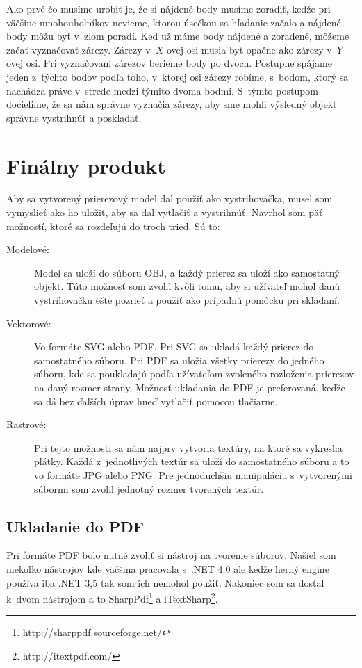 Ako prvé čo musíme urobiť je, že si nájdené body musíme zoradiť, kedže pri väčšine mnohouholníkov nevieme, ktorou úsečkou sa hľadanie začalo a nájdené body môžu byť v~zlom poradí. Keď už máme body nájdené a zoradené, môžeme začať vyznačovať zárezy. Zárezy v~$X$-ovej osi musia byť opačne ako zárezy v~$Y$-ovej osi.
Pri vyznačovaní zárezov berieme body po dvoch. Postupne spájame jeden z~týchto bodov podľa toho, v~ktorej osi zárezy robíme, s~bodom, ktorý sa nachádza práve v~strede medzi týmito dvoma bodmi. S~týmto postupom docielime, že sa nám správne vyznačia zárezy, aby sme mohli výsledný objekt správne vystrihnúť a poskladať.

\section{Finálny produkt} \label{sec:finalProduct}

Aby sa vytvorený prierezový model dal použiť ako vystrihovačka, musel som vymyslieť ako ho uložiť, aby sa dal vytlačiť a vystrihnúť. Navrhol som päť možností, ktoré sa rozdeľujú do troch tried. Sú to:
\begin{description}
\item[Modelové:] Model sa uloží do súboru OBJ, a každý prierez sa uloží ako samostatný objekt. Túto možnosť som zvolil kvôli tomu, aby si užívateľ mohol danú vystrihovačku ešte pozrieť a použiť ako prípadnú pomôcku pri skladaní.
\item[Vektorové:] Vo formáte SVG alebo PDF. Pri SVG sa ukladá každý prierez do samostatného súboru. Pri PDF sa uložia všetky prierezy do jedného súboru, kde sa poukladajú podľa užívateľom zvoleného rozloženia prierezov na daný rozmer strany. Možnosť ukladania do PDF je preferovaná, keďže sa dá bez ďalších úprav hneď vytlačiť pomocou tlačiarne.
\item[Rastrové:] Pri tejto možnosti sa nám najprv vytvoria textúry, na ktoré sa vykreslia plátky. Každá z~jednotlivých textúr sa uloží do samostatného súboru a to vo formáte JPG alebo PNG. Pre jednoduchšiu manipuláciu s~vytvorenými súbormi som zvolil jednotný rozmer tvorených textúr.
\end{description}

\subsection{Ukladanie do PDF} \label{sec:PDFcreator}
Pri formáte PDF bolo nutné zvoliť si nástroj na tvorenie súborov. Našiel som niekoľko nástrojov kde väčšina pracovala s~.NET 4,0 ale kedže herný engine používa iba .NET 3,5 tak som ich nemohol použiť. Nakoniec som sa dostal k~dvom nástrojom a to SharpPdf\footnote{http://sharppdf.sourceforge.net/} a iTextSharp\footnote{http://itextpdf.com/}. 

